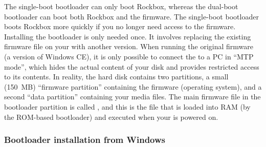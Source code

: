 
The single-boot bootloader can only boot Rockbox, whereas the dual-boot
bootloader can boot both Rockbox and the \playerman{} firmware.
The single-boot bootloader boots Rockbox more quickly if you no longer need
access to the \playerman{} firmware.\\

Installing the bootloader is only needed once. It involves replacing the
existing firmware file on your \dap{} with another version.
When running the original \playerman{} firmware (a version of Windows CE), it is
only possible to connect the \dap{} to a PC in ``MTP mode'', which hides
the actual content of your \daps{} disk and provides restricted access
to its contents.
In reality, the \daps{} hard disk contains two partitions, a small
(150~MB) ``firmware partition'' containing the \daps{} firmware (operating
system), and a second ``data partition'' containing your media files. The main
firmware file in the bootloader partition is called , and
this is the file that is loaded into RAM (by the \daps{} ROM-based
bootloader) and executed when your \dap{} is powered on.

\subsubsection{Bootloader installation from Windows}

